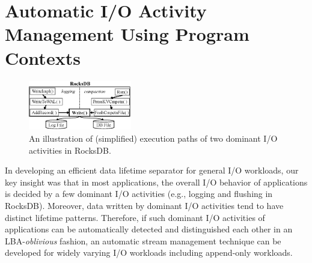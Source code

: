 \section{Automatic I/O Activity Management Using Program Contexts}
\label{sec:programcontext}
\begin{figure}[t]
	\centering
	\includegraphics[width=0.4\textwidth]{figure/writepath}
	\caption{An illustration of (simplified) execution paths of two dominant I/O activities in RocksDB.}
	\label{fig:iopath}
	\vspace{-20pt}
\end{figure}

In developing an efficient data lifetime separator for general I/O workloads,
our key insight was that in most applications,
the overall I/O behavior of 
applications is decided by a few dominant
I/O activities (e.g., logging and flushing in RocksDB). 
Moreover, 
data written by dominant I/O activities tend to have distinct lifetime patterns.
Therefore, if such dominant I/O activities of applications can be 
automatically detected and distinguished each other in an LBA-{\it oblivious} fashion, 
an automatic stream management technique can be developed for widely varying I/O workloads 
including append-only workloads.

